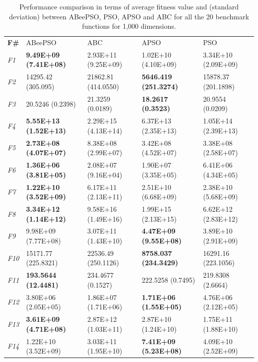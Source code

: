\begin{table}[!h]
\caption{\small{Performance comparison in terms of average fitness value and (standard deviation) between ABeePSO, PSO, APSO and ABC for all the 20 benchmark functions for 1,000 dimensions.}}
\label{tab:Comparison_1000D}
\begin{center}
\begin{tabular}{p{0.5cm}|p{2.5cm}|p{2.5cm}|p{2.5cm}|p{2.5cm}}
\hline\noalign{\smallskip}
\textbf{F\#}	& ABeePSO & ABC & APSO & PSO    \\		
\noalign{\smallskip}
\hline
\noalign{\smallskip}
\textit{F1}	& \textbf{9.49E+09 (7.41E+08)} & 2.93E+11 (9.25E+09) & 1.02E+10 (4.10E+09) & 3.34E+10 (2.09E+09)\\		
\textit{F2}	& 14295.42 (305.095) & 21862.81 (414.0550) & \textbf{5646.419 (251.3274)} & 15878.37 (201.1898)\\		
\textit{F3}	& 20.5246 (0.2398) & 21.3259 (0.0189) & \textbf{18.2617 (0.3523)} & 20.9554 (0.0209)\\
\textit{F4} & \textbf{5.55E+13 (1.52E+13)} & 2.29E+15 (4.13E+14) & 6.37E+13 (2.35E+13) & 1.05E+14 (2.39E+13)\\		
\textit{F5} & \textbf{2.73E+08 (4.07E+07)} & 8.38E+08 (2.99E+07) & 3.42E+08 (4.52E+07) & 3.38E+08 (2.58E+07)\\
\textit{F6} & \textbf{1.36E+06 (3.81E+05)} & 2.08E+07 (9.16E+04) & 1.90E+07 (3.35E+05) & 6.41E+06 (4.34E+05)\\
\textit{F7} & \textbf{1.22E+10 (3.52E+09)} & 6.17E+11 (2.13E+11) & 2.51E+10 (6.68E+09) & 2.38E+10 (5.68E+09)\\
\textit{F8} & \textbf{3.34E+12 (1.14E+12)} & 9.58E+16 (1.49E+16) & 1.99E+15 (2.13E+15) & 6.62E+12 (2.83E+12)\\
\textit{F9} & 9.98E+09 (7.77E+08) & 3.07E+11 (1.43E+10) & \textbf{4.47E+09 (9.55E+08)} & 3.89E+10 (2.91E+09)\\
\textit{F10}& 15171.77 (225.8321) & 22536.49 (250.1126) & \textbf{8758.037 (234.3429)} & 16291.16 (223.1056)\\
\textit{F11}& \textbf{193.5644 (12.4481)} & 234.4677 (0.1527) & 222.5258 (0.7495) & 219.8308 (2.6664)\\
\textit{F12}& 3.80E+06 (2.05E+05) & 1.86E+07 (1.71E+06) & \textbf{1.71E+06 (1.55E+05)} & 4.76E+06 (2.12E+05)\\
\textit{F13}& \textbf{3.61E+09 (4.71E+08)} & 2.87E+12 (1.03E+11) & 2.87E+10 (1.24E+10) & 1.75E+11 (1.88E+10)\\
\textit{F14}& 1.22E+10 (3.52E+09) & 3.03E+11 (1.95E+10) & \textbf{7.41E+09 (5.23E+08)} & 4.09E+10 (2.52E+09)\\

\end{tabular}
\end{center}
\end{table}
